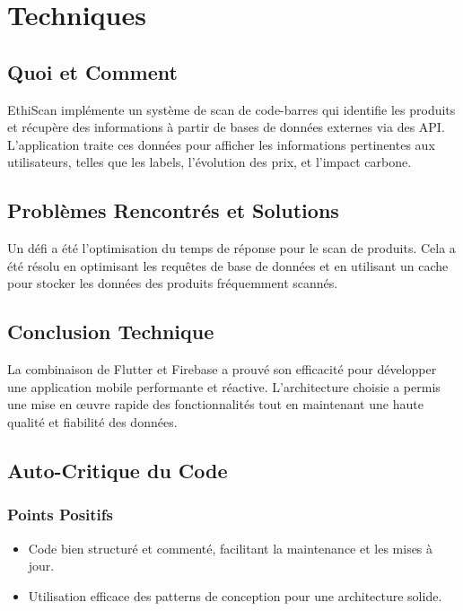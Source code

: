 \documentclass[11pt]{article}
\begin{document}

\section{Techniques}

\subsection{Quoi et Comment}

EthiScan implémente un système de scan de code-barres qui identifie les produits et récupère des informations à partir de bases de données externes via des API. L'application traite ces données pour afficher les informations pertinentes aux utilisateurs, telles que les labels, l'évolution des prix, et l'impact carbone.

\subsection{Problèmes Rencontrés et Solutions}

Un défi a été l'optimisation du temps de réponse pour le scan de produits. Cela a été résolu en optimisant les requêtes de base de données et en utilisant un cache pour stocker les données des produits fréquemment scannés.

\subsection{Conclusion Technique}

La combinaison de Flutter et Firebase a prouvé son efficacité pour développer une application mobile performante et réactive. L'architecture choisie a permis une mise en œuvre rapide des fonctionnalités tout en maintenant une haute qualité et fiabilité des données.

\subsection{Auto-Critique du Code}

\subsubsection{Points Positifs}
\begin{itemize}
    \item Code bien structuré et commenté, facilitant la maintenance et les mises à jour.
    \item Utilisation efficace des patterns de conception pour une architecture solide.
\end{itemize}
\end{document}

